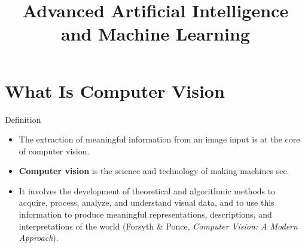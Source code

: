 




\newcommand{\citebutton}[2]{\beamergotobutton{\href{#2}{#1}}}

\newcommand{\titlefigure}{figure/vit-summary.png}
\newcommand{\learninggoals}{
  \item Computer vision: what it is, its tasks and applications
  \item From the NLP Transformer to the Vision Transformer: patches as tokens, inductive bias, scale
  \item Transformers for detection and segmentation: Swin, DETR, MaskFormer
  \item Multimodality: vision language models (CLIP, BLIP) and multipurpose models (Gato, OFA)
  \item Video: from frames to video Transformers (ViViT, TimeSformer)
}

\title{Advanced Artificial Intelligence and Machine Learning}
\date{}




\section{What Is Computer Vision}

\begin{frame}{Definition}
\begin{itemize}
  \item The extraction of meaningful information from an image input is at the core of computer vision.
  \item \textbf{Computer vision} is the science and technology of making machines see.
  \item It involves the development of theoretical and algorithmic methods to acquire, process, analyze, and understand visual data, and to use this information to produce meaningful representations, descriptions, and interpretations of the world (Forsyth \& Ponce, \textit{Computer Vision: A Modern Approach}).
\end{itemize}
\end{frame}

